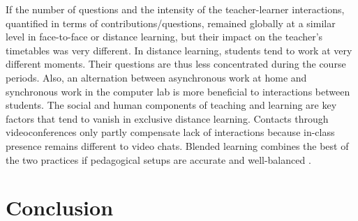 \documentclass{aims}
\theoremstyle{definition}
\begin{document}
If the number of questions and the intensity of the teacher-learner
interactions, quantified in terms of contributions/questions, remained
globally at a similar level in face-to-face or distance learning, but
their impact on the teacher's timetables was very different. In distance
learning, students tend to work at very different moments. Their
questions are thus less concentrated during the course periods. Also, an
alternation between asynchronous work at home and synchronous work in
the computer lab is more beneficial to interactions between students.
The social and human components of teaching and learning are key factors
that tend to vanish in exclusive distance learning. Contacts through
videoconferences only partly compensate lack of interactions because
in-class presence remains different to video chats. Blended learning
combines the best of the two practices if pedagogical setups are
accurate and well-balanced \cite{Bernard2014}.

\hypertarget{conclusion}{%
\section{Conclusion}\label{conclusion}}
\end{document}
